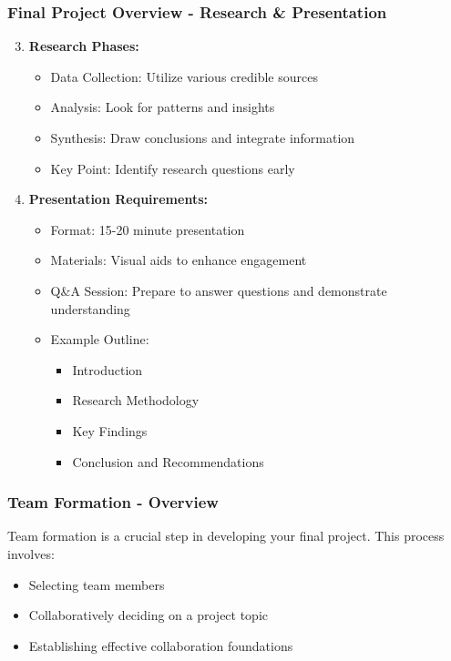 \documentclass{beamer}
\begin{document}
\begin{frame}[fragile]
    \frametitle{Final Project Overview - Research & Presentation}
    \begin{enumerate}
        \setcounter{enumi}{2}
        \item \textbf{Research Phases:}
            \begin{itemize}
                \item Data Collection: Utilize various credible sources
                \item Analysis: Look for patterns and insights
                \item Synthesis: Draw conclusions and integrate information
                \item Key Point: Identify research questions early
            \end{itemize}
        
        \item \textbf{Presentation Requirements:}
            \begin{itemize}
                \item Format: 15-20 minute presentation
                \item Materials: Visual aids to enhance engagement
                \item Q\&A Session: Prepare to answer questions and demonstrate understanding
                \item Example Outline:
                \begin{itemize}
                    \item Introduction
                    \item Research Methodology
                    \item Key Findings
                    \item Conclusion and Recommendations
                \end{itemize}
            \end{itemize}
    \end{enumerate}
\end{frame}

\begin{frame}[fragile]
    \frametitle{Team Formation - Overview}
    Team formation is a crucial step in developing your final project. This process involves:
    \begin{itemize}
        \item Selecting team members
        \item Collaboratively deciding on a project topic
        \item Establishing effective collaboration foundations
    \end{itemize}
\end{frame}
\end{document}
